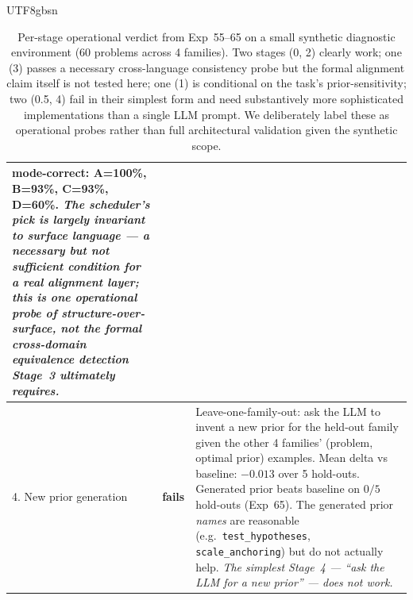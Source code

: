 \documentclass{article}
\begin{document}
\begin{CJK*}{UTF8}{gbsn}
\begin{table}[h]
\begin{tabular}{p{2.6cm} l p{8cm}}
      mode-correct: A=100\%, B=93\%, C=93\%, D=60\%. \emph{The
      scheduler's pick is largely invariant to surface language ---
      a necessary but not sufficient condition for a real
      alignment layer; this is one operational probe of
      structure-over-surface, not the formal cross-domain
      equivalence detection Stage~3 ultimately requires.} \\
  \midrule
  4. New prior generation
    & \cellcolor{red!18}\textbf{fails}
    & Leave-one-family-out: ask the LLM to invent a new prior
      for the held-out family given the other 4 families'
      (problem, optimal prior) examples. Mean delta vs baseline:
      \(-0.013\) over 5 hold-outs. Generated prior beats
      baseline on \(0/5\) hold-outs (Exp~65). The generated prior
      \emph{names} are reasonable (e.g.\
      \texttt{test\_hypotheses}, \texttt{scale\_anchoring}) but
      do not actually help. \emph{The simplest Stage~4 ---
      ``ask the LLM for a new prior'' --- does not work.} \\
  \bottomrule
\end{tabular}
\caption{Per-stage operational verdict from Exp~55--65 on a
small synthetic diagnostic environment (60 problems across 4
families). Two stages (0, 2) clearly work; one (3) passes a
necessary cross-language consistency probe but the formal
alignment claim itself is not tested here; one (1) is conditional
on the task's prior-sensitivity; two (0.5, 4) fail in their
simplest form and need substantively more sophisticated
implementations than a single LLM prompt. We deliberately label
these as operational probes rather than full architectural
validation given the synthetic scope.}
\label{tab:stage-verdicts}
\end{table}


\end{CJK*}
\end{document}
